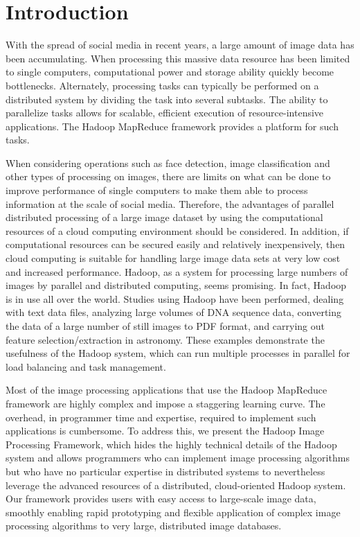 \documentclass[conference]{IEEEtran}
\begin{document}
	\section{Introduction}
	With the spread of social media in recent years, a large amount of image data has been accumulating. When processing this massive data resource has been limited to single computers, computational power and storage ability quickly become bottlenecks. Alternately, processing tasks can typically be performed on a distributed system by dividing the task into several subtasks. The ability to parallelize tasks allows for scalable, efficient execution of resource-intensive applications.  The Hadoop MapReduce framework provides a platform for such tasks.
	
	When considering operations such as face detection, image classification\cite{Li2009} and other types of processing on images, there are limits on what can be done to improve performance of single computers to make them able to process information at the scale of social media. Therefore, the advantages of parallel distributed processing of a large image dataset by using the computational resources of a cloud computing environment should be considered. In addition, if computational resources can be secured easily and relatively inexpensively, then cloud computing is suitable for handling large image data sets at very low cost and increased performance. Hadoop, as a system for processing large numbers of images by parallel and distributed computing, seems promising. In fact, Hadoop is in use all over the world. Studies using Hadoop have been performed, dealing with text data files, analyzing large volumes of DNA sequence data, converting the data of a large number of still images to PDF format, and carrying out feature selection/extraction in astronomy. %
These examples demonstrate the usefulness of the Hadoop system, which can run multiple processes in parallel for load balancing and task management.
	
	Most of the image processing applications that use the Hadoop MapReduce framework are highly complex and impose a staggering learning curve.  The overhead, in programmer time and expertise, required to implement such applications is cumbersome.  To address this, we present the Hadoop Image Processing Framework, which hides the highly technical details of the Hadoop system and allows programmers who can implement image processing algorithms but who have no particular expertise in distributed systems to nevertheless leverage the advanced resources of a distributed, cloud-oriented Hadoop system. Our framework provides users with easy access to large-scale image data, smoothly enabling rapid prototyping and flexible application of complex image processing algorithms to very large, distributed image databases.
	
\end{document}
